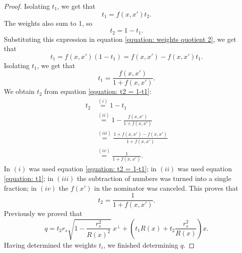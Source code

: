 \documentclass[10pt,a4paper]{amsart}
\begin{document}
\begin{proof}
	Isolating $t_1$, we get that
	\begin{equation}
		\label{equation: weights quotient 2}
		t_1 = f(x, x') t_2.
	\end{equation}
	The weights also sum to 1, so
	\begin{equation}
		\label{equation: t2 = 1-t1}
		t_2 = 1-t_1.
	\end{equation}
	Substituting this expression in equation \ref{equation: weights quotient 2}, we get that
	\begin{equation}
		t_1 = f(x, x') (1-t_1) = f(x, x') - f(x, x') t_1.
	\end{equation}
	Isolating $t_1$, we get that
	\begin{equation}
		\label{equation: t1}
		t_1 = \frac{f(x, x')}{1 + f(x, x')}.
	\end{equation}
	We obtain $t_2$ from equation \ref{equation: t2 = 1-t1}:
	\begin{align*}
		t_2 &\stackrel{(i)}{=} 1-t_1 \\
		&\stackrel{(ii)}{=} 1 -\frac{f(x, x')}{1 + f(x, x')} \\
		&\stackrel{(iii)}{=} \frac{1+f(x, x') - f(x, x')}{1 + f(x, x')} \\
		&\stackrel{(iv)}{=} \frac{1}{1+f(x, x')}.
	\end{align*}
	In $(i)$ was used equation \ref{equation: t2 = 1-t1}; in $(ii)$ was used equation \ref{equation: t1}; in $(iii)$ the subtraction of numbers was turned into a single fraction; in $(iv)$ the $f(x')$ in the nominator was canceled. This proves that
	\begin{equation}
		\label{equation: t2}
		t_2 = \frac{1}{1+f(x, x')}.
	\end{equation}
	Previously we proved that
	\begin{equation}
		\label{equation: q}
		q = t_2 r_s \sqrt{1 - \frac{r_s^2}{R(x)^2}} \ x^\perp + \left( t_1 R(x) + t_2 \frac{r_s^2}{R(x)} \right) x.
	\end{equation}
	Having determined the weights $t_i$, we finished determining $q$.
	

\end{proof}
\end{document}
